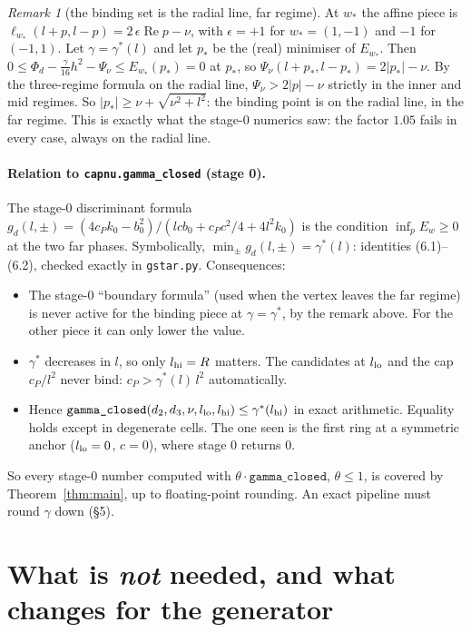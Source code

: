\documentclass[11pt]{article}
\theoremstyle{remark}
\newtheorem{remark}{Remark}
\renewcommand{\Re}{\operatorname{Re}}
\begin{document}
\begin{remark}[the binding set is the radial line, far regime]
At $w_*$ the affine piece is $\ell_{w_*}(l+p,l-p)=2\,\epsilon\Re p-\nu$, with $\epsilon=+1$ for $w_*=(1,-1)$ and $-1$ for
$(-1,1)$. Let $\gamma=\gamma^*(l)$ and let $p_*$ be the (real) minimiser of $E_{w_*}$. Then
$0\le\Phi_d-\frac\gamma{16}h^2-\Psi_\nu\le E_{w_*}(p_*)=0$ at $p_*$, so $\Psi_\nu(l+p_*,l-p_*)=2|p_*|-\nu$. By the three-regime
formula on the radial line, $\Psi_\nu>2|p|-\nu$ strictly in the inner and mid regimes. So $|p_*|\ge\nu+\sqrt{\nu^2+l^2}$: the
binding point is on the radial line, in the far regime. This is exactly what the stage-0 numerics saw: the factor $1.05$ fails
in every case, always on the radial line.
\end{remark}

\paragraph{Relation to \texttt{capnu.gamma\_closed} (stage 0).} The stage-0 discriminant formula
$g_d(l,\pm)=(4c_Pk_0-b_0^2)/(lcb_0+c_Pc^2/4+4l^2k_0)$ is the condition $\inf_pE_{w}\ge0$ at the two far phases. Symbolically,
$\min_\pm g_d(l,\pm)=\gamma^*(l)$: identities (6.1)--(6.2), checked exactly in \texttt{gstar.py}. Consequences:
\begin{itemize}
\item The stage-0 ``boundary formula'' (used when the vertex leaves the far regime) is never active for the binding piece at
$\gamma=\gamma^*$, by the remark above. For the other piece it can only lower the value.
\item $\gamma^*$ decreases in $l$, so only $l_{\rm hi}=R$ matters. The candidates at $l_{\rm lo}$ and the cap $c_P/l^2$ never bind:
$c_P>\gamma^*(l)\,l^2$ automatically.
\item Hence $\texttt{gamma\_closed}(d_2,d_3,\nu,l_{\rm lo},l_{\rm hi})\le\gamma^*(l_{\rm hi})$ in exact arithmetic. Equality holds
except in degenerate cells. The one seen is the first ring at a symmetric anchor ($l_{\rm lo}=0$, $c=0$), where stage 0 returns 0.
\end{itemize}
So every stage-0 number computed with $\theta\cdot\texttt{gamma\_closed}$, $\theta\le1$, is covered by Theorem~\ref{thm:main},
up to floating-point rounding. An exact pipeline must round $\gamma$ down (\S5).

\section{What is \emph{not} needed, and what changes for the generator}
\end{document}

